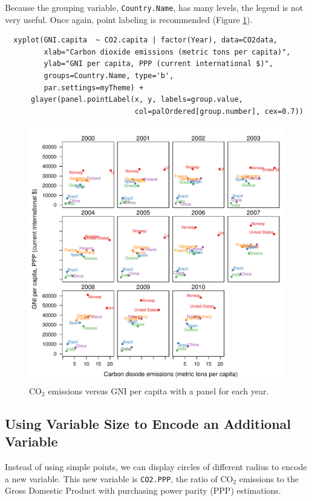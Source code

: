 Because the grouping variable, \texttt{Country.Name}, has many levels, the
legend is not very useful. Once again, point labeling is recommended
(Figure \ref{fig:CO2-GNI-panel-labels}).

\lstset{language=r,label= ,caption= ,captionpos=b,numbers=none}
\begin{lstlisting}
  xyplot(GNI.capita  ~ CO2.capita | factor(Year), data=CO2data,
         xlab="Carbon dioxide emissions (metric tons per capita)",
         ylab="GNI per capita, PPP (current international $)",
         groups=Country.Name, type='b',
         par.settings=myTheme) + 
      glayer(panel.pointLabel(x, y, labels=group.value,
                              col=palOrdered[group.number], cex=0.7))
\end{lstlisting}

\begin{figure}[htbp]
\centering
\includegraphics[width=.9\linewidth]{figs/CO2_capita_panel_labels.pdf}
\caption{\(\mathrm{CO_2}\) emissions versus GNI per capita with a panel for each year. \label{fig:CO2-GNI-panel-labels}}
\end{figure}

\subsection{\floweroneleft Using Variable Size to Encode an Additional Variable}
\label{sec:orgd72398b}
Instead of using simple points, we can display circles of
different radius to encode a new variable. This new variable is
\texttt{CO2.PPP}, the ratio of \(\mathrm{CO_2}\) emissions to the Gross Domestic
Product with purchasing power parity (PPP) estimations.

